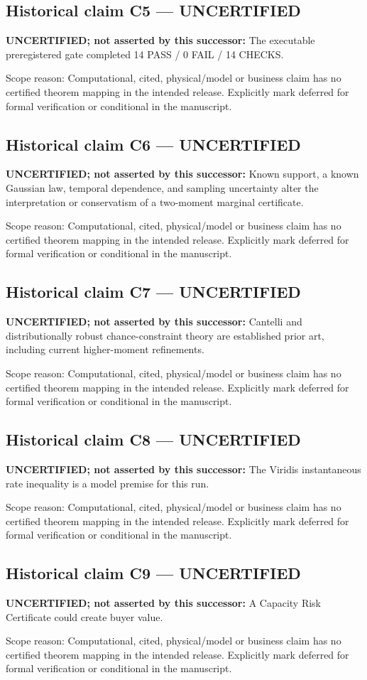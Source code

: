 \documentclass[11pt]{article}
\begin{document}
\subsection*{Historical claim C5 --- UNCERTIFIED}
\textbf{UNCERTIFIED; not asserted by this successor:} The executable preregistered gate completed 14 PASS / 0 FAIL / 14 CHECKS.
\par Scope reason: Computational, cited, physical/model or business claim has no certified theorem mapping in the intended release. Explicitly mark deferred for formal verification or conditional in the manuscript.
\subsection*{Historical claim C6 --- UNCERTIFIED}
\textbf{UNCERTIFIED; not asserted by this successor:} Known support, a known Gaussian law, temporal dependence, and sampling uncertainty alter the interpretation or conservatism of a two-moment marginal certificate.
\par Scope reason: Computational, cited, physical/model or business claim has no certified theorem mapping in the intended release. Explicitly mark deferred for formal verification or conditional in the manuscript.
\subsection*{Historical claim C7 --- UNCERTIFIED}
\textbf{UNCERTIFIED; not asserted by this successor:} Cantelli and distributionally robust chance-constraint theory are established prior art, including current higher-moment refinements.
\par Scope reason: Computational, cited, physical/model or business claim has no certified theorem mapping in the intended release. Explicitly mark deferred for formal verification or conditional in the manuscript.
\subsection*{Historical claim C8 --- UNCERTIFIED}
\textbf{UNCERTIFIED; not asserted by this successor:} The Viridis instantaneous rate inequality is a model premise for this run.
\par Scope reason: Computational, cited, physical/model or business claim has no certified theorem mapping in the intended release. Explicitly mark deferred for formal verification or conditional in the manuscript.
\subsection*{Historical claim C9 --- UNCERTIFIED}
\textbf{UNCERTIFIED; not asserted by this successor:} A Capacity Risk Certificate could create buyer value.
\par Scope reason: Computational, cited, physical/model or business claim has no certified theorem mapping in the intended release. Explicitly mark deferred for formal verification or conditional in the manuscript.
\end{document}
